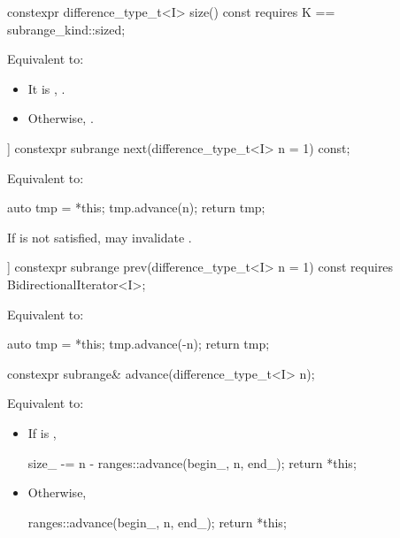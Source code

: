 %
\begin{itemdecl}
constexpr difference_type_t<I> size() const
  requires K == subrange_kind::sized;
\end{itemdecl}

\begin{itemdescr}
\pnum
\effects Equivalent to:
\begin{itemize}
\item It  is , .
\item Otherwise, .
\end{itemize}
\end{itemdescr}

%
\begin{itemdecl}
[[nodiscard]] constexpr subrange next(difference_type_t<I> n = 1) const;
\end{itemdecl}

\begin{itemdescr}
\pnum
\effects Equivalent to:
\begin{codeblock}
auto tmp = *this;
tmp.advance(n);
return tmp;
\end{codeblock}

\pnum \enternote If  is not satisfied, 
may invalidate . \exitnote
\end{itemdescr}

%
\begin{itemdecl}
[[nodiscard]] constexpr subrange prev(difference_type_t<I> n = 1) const
  requires BidirectionalIterator<I>;
\end{itemdecl}

\begin{itemdescr}
\pnum
\effects Equivalent to:
\begin{codeblock}
auto tmp = *this;
tmp.advance(-n);
return tmp;
\end{codeblock}
\end{itemdescr}

%
\begin{itemdecl}
constexpr subrange& advance(difference_type_t<I> n);
\end{itemdecl}

\begin{itemdescr}
\pnum
\effects Equivalent to:
\begin{itemize}
\item If  is ,
\begin{codeblock}
size_ -= n - ranges::advance(begin_, n, end_);
return *this;
\end{codeblock}
\item Otherwise,
\begin{codeblock}
ranges::advance(begin_, n, end_);
return *this;
\end{codeblock}
\end{itemize}
\end{itemdescr}


